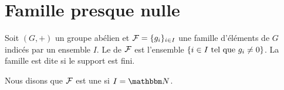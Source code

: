 \section{Famille presque nulle}

Soit \( (G,+)\) un groupe abélien et \( \mathcal{F}=\{ g_i \}_{i\in I}\) une famille d'éléments de \( G\) indicés par un ensemble \( I\). Le  de \( \mathcal{F}\) est l'ensemble \( \{ i\in I\text{ tel que } g_i\neq 0 \}\). La famille est dite  si le support est fini.

Nous disons que \( \mathcal{F}\) est une  si \( I=\eN\).

